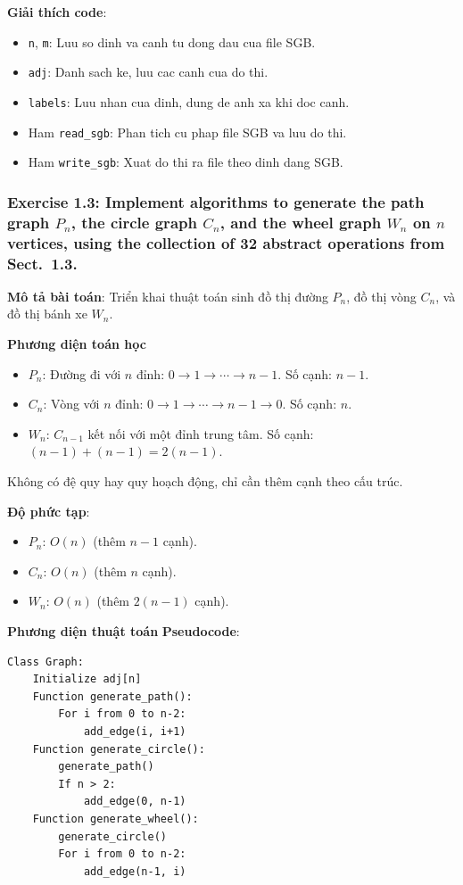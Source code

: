 \documentclass[a4paper,12pt]{article}
\begin{document}
\bigskip
\textbf{Giải thích code}:
\begin{itemize}
    \item \texttt{n}, \texttt{m}: Luu so dinh va canh tu dong dau cua file SGB.
    \item \texttt{adj}: Danh sach ke, luu cac canh cua do thi.
    \item \texttt{labels}: Luu nhan cua dinh, dung de anh xa khi doc canh.
    \item Ham \texttt{read\_sgb}: Phan tich cu phap file SGB va luu do thi.
    \item Ham \texttt{write\_sgb}: Xuat do thi ra file theo dinh dang SGB.
\end{itemize}

\subsubsection{Exercise 1.3: Implement algorithms to generate the path graph $P_n$, the circle graph $C_n$, and the wheel graph $W_n$ on $n$ vertices, using the collection of 32 abstract operations from Sect.~1.3.}
\textbf{Mô tả bài toán}: Triển khai thuật toán sinh đồ thị đường \( P_n \), đồ thị vòng \( C_n \), và đồ thị bánh xe \( W_n \).

\textbf{Phương diện toán học}
\begin{itemize}
    \item \textbf{\( P_n \)}: Đường đi với \( n \) đỉnh: \( 0 \to 1 \to \cdots \to n-1 \). Số cạnh: \( n-1 \).
    \item \textbf{\( C_n \)}: Vòng với \( n \) đỉnh: \( 0 \to 1 \to \cdots \to n-1 \to 0 \). Số cạnh: \( n \).
    \item \textbf{\( W_n \)}: \( C_{n-1} \) kết nối với một đỉnh trung tâm. Số cạnh: \( (n-1) + (n-1) = 2(n-1) \).
\end{itemize}
Không có đệ quy hay quy hoạch động, chỉ cần thêm cạnh theo cấu trúc.

\textbf{Độ phức tạp}:
\begin{itemize}
    \item \( P_n \): \( O(n) \) (thêm \( n-1 \) cạnh).
    \item \( C_n \): \( O(n) \) (thêm \( n \) cạnh).
    \item \( W_n \): \( O(n) \) (thêm \( 2(n-1) \) cạnh).
\end{itemize}

\textbf{Phương diện thuật toán}
\textbf{Pseudocode}:
\begin{verbatim}
Class Graph:
    Initialize adj[n]
    Function generate_path():
        For i from 0 to n-2:
            add_edge(i, i+1)
    Function generate_circle():
        generate_path()
        If n > 2:
            add_edge(0, n-1)
    Function generate_wheel():
        generate_circle()
        For i from 0 to n-2:
            add_edge(n-1, i)
\end{verbatim}
\end{document}
